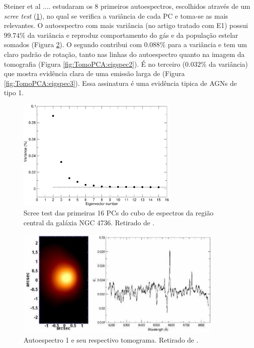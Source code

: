 Steiner et al .... estudaram os 8 primeiros autoespectros, escolhidos através de um {\em scree
test} (\ref{fig:TomoPCA:scree}), no qual se verifica a variância de cada PC e
toma-se as mais relevantes. O autoespectro com mais variância (no artigo tratado
com E1) possui $99.74\%$ da variância e reproduz comportamento do gás e da
população estelar somados (Figura \ref{fig:TomoPCA:eigspec1}). O segundo
contribui com $0.088\%$ para a variância e tem um claro padrão de rotação, tanto
nas linhas do autoespectro quanto na imagem da tomografia (Figura
\ref{fig:TomoPCA:eigspec2}). É no terceiro ($0.032\%$ da variância) que
mostra evidência clara de uma emissão larga de \Halpha (Figura
\ref{fig:TomoPCA:eigspec3}). Essa assinatura é uma evidência tipica de AGNs de tipo 1.


\begin{figure}
    \includegraphics[width=0.7\textwidth]{figuras/figSteiner2009fig1.pdf}
    \caption[{\em Scree test} na galáxia NGC 4736.]
    {Scree test das primeiras 16 PCs do cubo de espectros da região
    central da galáxia NGC 4736. 
    Retirado de \citet[][fig. 1]{Steiner2009}.}
    \label{fig:TomoPCA:scree}
\end{figure}

\begin{figure}
    \includegraphics[width=0.9\textwidth]{figuras/figSteiner2009figA1.pdf}
    \caption[Tomograma e autoespectro 1 da galáxia NGC 4736.]
    {Autoespectro 1 e seu respectivo tomograma. Retirado de \citet[][fig.
    A1]{Steiner2009}.}
    \label{fig:TomoPCA:eigspec1}
\end{figure}

